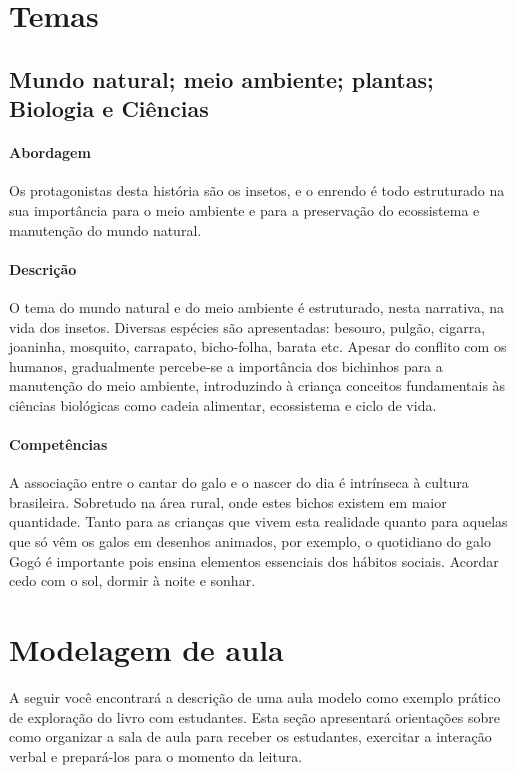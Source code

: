 \documentclass[11pt]{extarticle}
\begin{document}
\section{Temas}

\subsection{Mundo natural; meio ambiente; plantas; Biologia e Ciências}

\paragraph{Abordagem} Os protagonistas desta história são os insetos, e o enrendo é todo estruturado na sua importância para o meio ambiente e para a preservação do ecossistema e manutenção do mundo natural.

 
\paragraph{Descrição} O tema do mundo natural e do meio ambiente é estruturado, nesta narrativa, na vida dos insetos. Diversas espécies são apresentadas: besouro, pulgão, cigarra, joaninha, mosquito, carrapato, bicho-folha, barata etc. Apesar do conflito com os humanos, gradualmente percebe-se a importância dos bichinhos para a manutenção do meio ambiente, introduzindo à criança conceitos fundamentais às ciências biológicas como cadeia alimentar, ecossistema e ciclo de vida.

\paragraph{Competências} 
A associação entre o cantar do galo e o nascer do dia é intrínseca
à cultura brasileira. Sobretudo na área rural, onde estes bichos
existem em maior quantidade. Tanto para as crianças que vivem
esta realidade quanto para aquelas que só vêm os galos em desenhos
animados, por exemplo, o quotidiano do galo Gogó é importante 
pois ensina elementos essenciais dos hábitos sociais. Acordar cedo com
o sol, dormir à noite e sonhar. 

\section{Modelagem de aula}
A seguir você encontrará a descrição de uma aula modelo como exemplo 
prático de exploração do livro com estudantes. Esta seção apresentará 
orientações sobre como organizar a sala de aula para receber os 
estudantes, exercitar a interação verbal e prepará-los para o 
momento da leitura.
\end{document}
